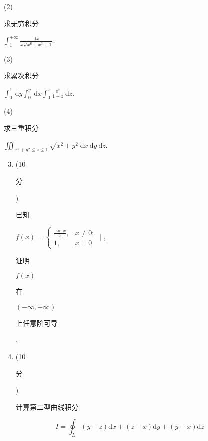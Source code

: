 \documentclass[10pt]{article}
\begin{document}
(2) \begin{CJK}{UTF8}{mj}求无穷积分\end{CJK} $\int_{1}^{+\infty} \frac{\mathrm{d} x}{x \sqrt{x^{6}+x^{3}+1}}$;

(3) \begin{CJK}{UTF8}{mj}求累次积分\end{CJK} $\int_{0}^{1} \mathrm{~d} y \int_{0}^{y} \mathrm{~d} x \int_{0}^{x} \frac{\mathrm{e}^{z}}{1-z} \mathrm{~d} z$.

(4) \begin{CJK}{UTF8}{mj}求三重积分\end{CJK} $\iiint_{x^{2}+y^{2} \leq z \leq 1} \sqrt{x^{2}+y^{2}} \mathrm{~d} x \mathrm{~d} y \mathrm{~d} z$.

\begin{enumerate}
  \setcounter{enumi}{2}
  \item (10 \begin{CJK}{UTF8}{mj}分\end{CJK}) \begin{CJK}{UTF8}{mj}已知\end{CJK} $f(x)=\left\{\begin{array}{cc}\frac{\sin x}{x}, & x \neq 0 ; \\ 1, & x=0\end{array} \mid\right.$, \begin{CJK}{UTF8}{mj}证明\end{CJK} $f(x)$ \begin{CJK}{UTF8}{mj}在\end{CJK} $(-\infty,+\infty)$ \begin{CJK}{UTF8}{mj}上任意阶可导\end{CJK}.

  \item (10 \begin{CJK}{UTF8}{mj}分\end{CJK}) \begin{CJK}{UTF8}{mj}计算第二型曲线积分\end{CJK}

\end{enumerate}
$$
I=\oint_{L}(y-z) \mathrm{d} x+(z-x) \mathrm{d} y+(y-x) \mathrm{d} z
$$
\end{document}
